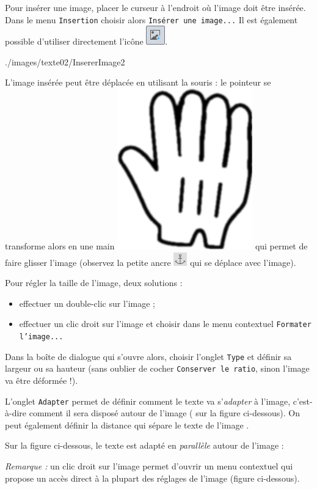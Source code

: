 Pour insérer une image, placer le curseur à l'endroit où l'image doit être insérée. Dans le menu \texttt{Insertion} choisir alors \texttt{Insérer une image...} Il est également possible d'utiliser directement l'icône \includegraphics[width=.6cm]{./images/texte02/iconeInsererImage}. 

%
              {./images/texte02/InsererImage2}{\textwidth}

L'image insérée peut être déplacée en utilisant la souris : le pointeur se transforme alors en une main \includegraphics[width=.3cm]{./images/texte02/pointeurMain} qui permet de faire glisser l'image (observez la petite ancre \includegraphics[width=.4cm]{./images/texte02/iconeAncre} qui se déplace avec l'image).



Pour régler la taille de l'image, deux solutions :
\begin{itemize}
\item effectuer un double-clic sur l'image ;
\item effectuer un clic droit sur l'image et choisir dans le menu contextuel \texttt{Formater l'image...}  
\end{itemize}

Dans la boîte de dialogue qui s'ouvre alors, choisir l'onglet \texttt{Type} et définir sa largeur ou sa hauteur (sans oublier de cocher \texttt{Conserver le ratio}, sinon l'image va être déformée !). 


L'onglet \texttt{Adapter} permet de définir comment le texte va s'\emph{adapter} à l'image, c'est-à-dire comment il sera disposé autour de l'image ( sur la figure ci-dessous). On peut également définir la distance qui sépare le texte de l'image .  


Sur la figure ci-dessous, le texte est adapté en \emph{parallèle} autour de l'image : 






\emph{Remarque :} un clic droit sur l'image permet d'ouvrir un menu contextuel qui propose un accès direct à la plupart des réglages de l'image (figure ci-dessous). 







